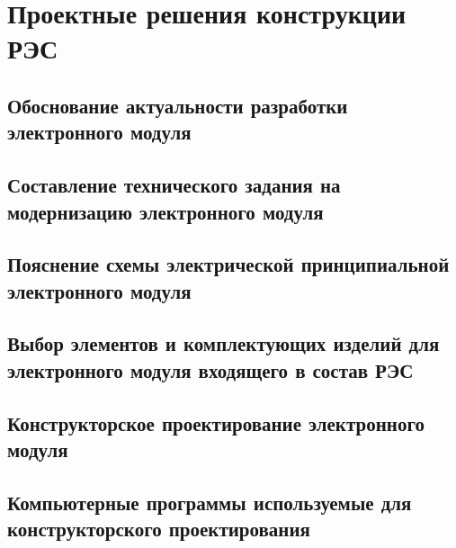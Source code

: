
\section{Проектные решения конструкции РЭС}

\subsection{Обоснование актуальности разработки электронного модуля}

\subsection{Составление технического задания на модернизацию электронного модуля}

\subsection{Пояснение схемы электрической принципиальной электронного модуля}

\subsection{Выбор элементов и комплектующих изделий для электронного модуля входящего в состав РЭС}

\subsection{Конструкторское проектирование электронного модуля}

\subsection{Компьютерные программы используемые для конструкторского проектирования}

\newpage
